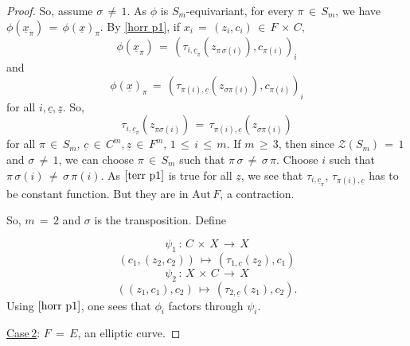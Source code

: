 \documentclass[12pt,reqno]{amsart}
\theoremstyle{definition}
\numberwithin{equation}{section}
\begin{document}
\begin{proof}
So, assume $\sigma\,\neq\,1$. As $\phi$ is $S_m$-equivariant, for every $\pi\,\in\,S_{m}$, we have $\phi(\underline{x}_{\pi})\,=\, \phi(\underline{x})_{\pi}$. By \eqref{horr p1}, if $x_{i}\,=\, (z_{i},c_{i})\,\in\,F\,\times\, C,$
\begin{equation*}
\phi(\underline{x}_{\pi})\,=\, (\tau_{i, \underline{c}_{\pi}}(z_{\pi\,\sigma(i)}), c_{\pi(i)})_{i}     
\end{equation*}
and
\begin{equation*}
\phi(\underline{x})_{\pi}\,=\, (\tau_{\pi(i),\underline{c}}(z_{\sigma \pi{(i)}}), c_{\pi(i)})_i  
\end{equation*}
for all $i,\underline{c}, \underline{z}$. So, 
\begin{equation}\label{terr p1}
\tau_{i, \underline{c}_{\pi}}(z_{\pi\sigma{(i)}})\,=\, \tau_{\pi(i),\underline{c}}(z_{\sigma\pi(i)})  
\end{equation}
for all $\pi\,\in\, S_{m}$, $\underline{c}\,\in\, C^{m}, \underline{z}\,\in\,F^{m}$, $1\,\leq\, i\,\leq\, m$. If $m\,\geq\,3$, then since $\mathcal{Z}(S_{m})\,=\, 1$ and $\sigma\,\neq\, 1$, we can choose $\pi\,\in\, S_{m}$ such that $\pi\,\sigma\,\neq\, \sigma\,\pi$. Choose $i$ such that $\pi\,\sigma(i)\,\neq\,\sigma\,\pi(i)$. As $\eqref{terr p1}$ is true for all $\underline{z}$, we see that $\tau_{i,\underline{c}_{\pi}}$, $\tau_{\pi(i),\underline{c}}$ has to be constant function. But they are in $\textrm{Aut}\,F$, a contraction. 

So, $m\,=\,2$ and $\sigma$ is the transposition. Define


\begin{equation*}
\psi_{1}\,:\, C\,\times \,X\,\longrightarrow\, X    
\end{equation*}
\begin{equation*}
(c_{1},(z_{2}, c_{2}))\,\longmapsto\, (\tau_{1,\underline{c}}(z_{2}),c_{1})    
\end{equation*}
\begin{equation*}
\psi_{2}\,:\, X\,\times\,C\,\longrightarrow\, X    
\end{equation*}
\begin{equation*}
((z_{1},c_{1}), c_{2})\,\longmapsto\, (\tau_{2,\underline{c}}(z_{1}), c_{2}).    
\end{equation*}
Using $\eqref{horr p1}$, one sees that $\phi_{i}$ factors through $\psi_{i}$.


\underline{Case\,2}: $F\,=\, E$, an elliptic curve.


\end{proof}
\end{document}
